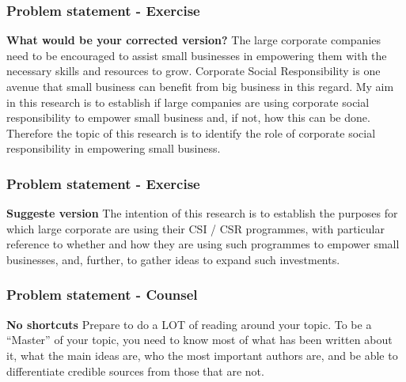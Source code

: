 \documentclass{beamer}
\begin{document}
\begin{frame}
\frametitle{\textbf{Problem statement - Exercise}}
\begin{block}{\textbf{What would be your corrected version?}}
\Large The large corporate companies need to be encouraged to assist small businesses in empowering them with the necessary skills and resources to grow. Corporate Social Responsibility is one avenue that small business can benefit from big business in this regard. My aim in this research is to establish if large companies are using corporate social responsibility to empower small business and, if not, how this can be done. Therefore the topic of this research is to identify the role of corporate social responsibility in empowering small business.\\

\end{block}

\end{frame}

\begin{frame}
\frametitle{\textbf{Problem statement - Exercise}}
\begin{block}{\textbf{Suggeste version}}
\Large The intention of this research is to establish the purposes for which large corporate are using their CSI / CSR programmes, with particular reference to whether and how they are using such programmes to empower small businesses, and, further, to gather ideas to expand such investments.\\

\end{block}

\end{frame}

\begin{frame}
\frametitle{\textbf{Problem statement - Counsel}}
\begin{block}{\textbf{No shortcuts}}
\Large Prepare to do a LOT of reading around your topic.
To be a “Master” of your topic, you need to know most of what has been
written about it, what the main ideas are, who the most important authors
are, and be able to differentiate credible sources from those that are not.\\

\end{block}

\end{frame}
\end{document}
